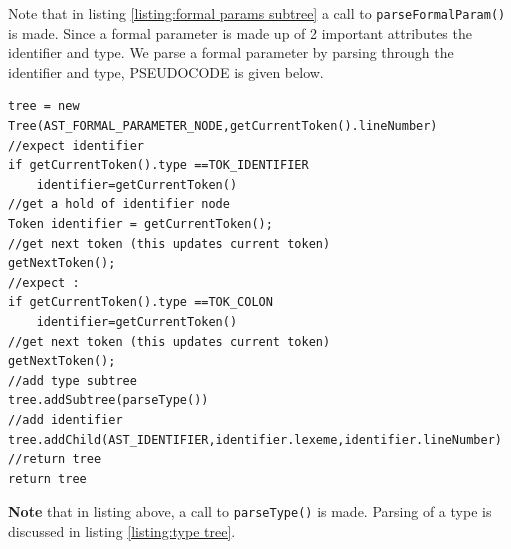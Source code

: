Note that in listing \ref{listing:formal params subtree} a call to \verb!parseFormalParam()! is made. Since a formal parameter is made up of 2 important attributes the identifier and type. We parse a formal parameter by parsing through the identifier and type, PSEUDOCODE is given below.
\begin{lstlisting}[caption=PSEUDOCODE for building a formal parameter subtree (\emph{parseFormalParam()}),label=listing:formal param subtree]
tree = new Tree(AST_FORMAL_PARAMETER_NODE,getCurrentToken().lineNumber)
//expect identifier 
if getCurrentToken().type ==TOK_IDENTIFIER
    identifier=getCurrentToken()
//get a hold of identifier node
Token identifier = getCurrentToken();
//get next token (this updates current token)
getNextToken();
//expect :
if getCurrentToken().type ==TOK_COLON
    identifier=getCurrentToken()
//get next token (this updates current token)
getNextToken();
//add type subtree
tree.addSubtree(parseType())
//add identifier
tree.addChild(AST_IDENTIFIER,identifier.lexeme,identifier.lineNumber)
//return tree
return tree
\end{lstlisting}
\textbf{Note} that in listing above, a call to \verb!parseType()! is made. Parsing of a type is discussed in listing \ref{listing:type tree}.






